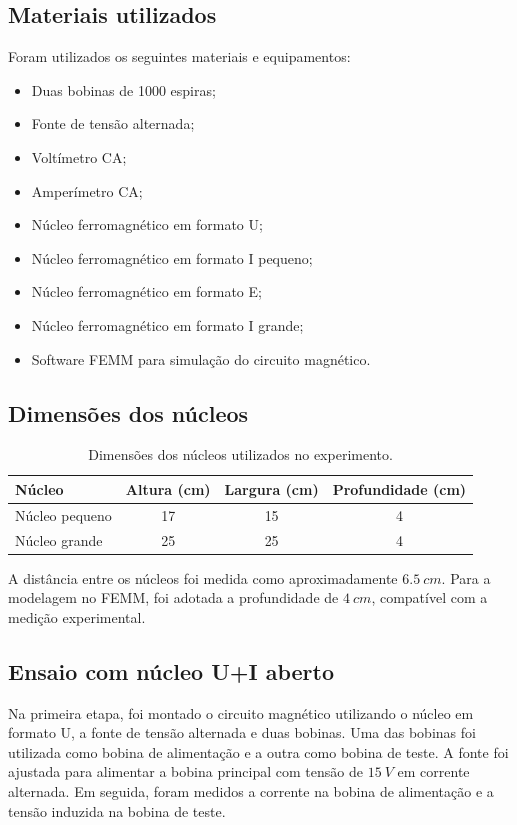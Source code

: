 \documentclass[11pt,a4paper]{article}
\begin{document}
\subsection{Materiais utilizados} 
Foram utilizados os seguintes materiais e equipamentos: 
\begin{itemize} 
    \item Duas bobinas de \num{1000} espiras; 
    \item Fonte de tensão alternada; 
    \item Voltímetro CA; 
    \item Amperímetro CA; 
    \item Núcleo ferromagnético em formato U; 
    \item Núcleo ferromagnético em formato I pequeno;
    \item Núcleo ferromagnético em formato E; 
    \item Núcleo ferromagnético em formato I grande; 
    \item Software FEMM para simulação do circuito magnético. 
\end{itemize}
\subsection{Dimensões dos núcleos}

\begin{table}[H] 
    \centering 
    \caption{Dimensões dos núcleos utilizados no experimento.} \label{tab:dimensoes_nucleos} 
    \begin{tabular}{lccc} 
        \toprule Núcleo & Altura (cm) & Largura (cm) & Profundidade (cm) \\ 
        \midrule Núcleo pequeno & 17 & 15 & 4 \\ Núcleo grande & 25 & 25 & 4 \\ \bottomrule 
    \end{tabular} 
\end{table}

A distância entre os núcleos foi medida como aproximadamente \(\SI{6,5}{cm}\). Para a modelagem no FEMM, foi adotada a profundidade de \(\SI{4}{cm}\), compatível com a medição experimental.

\subsection{Ensaio com núcleo U+I aberto}

Na primeira etapa, foi montado o circuito magnético utilizando o núcleo em formato U, a fonte de tensão alternada e duas bobinas. Uma das bobinas foi utilizada como bobina de alimentação e a outra como bobina de teste. A fonte foi ajustada para alimentar a bobina principal com tensão de \(\SI{15}{V}\) em corrente alternada. Em seguida, foram medidos a corrente na bobina de alimentação e a tensão induzida na bobina de teste.
\end{document}
